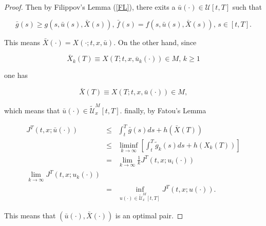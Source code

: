 \begin{proof}
Then by Filippov's Lemma (\ref{FL}), there exits a $\bar{u}(\cdot)\in 
\mathcal{U}[t,T]$ such that

$$\bar{g}(s)\geq 
g(s,\bar{u}(s),\bar{X}(s)),\,\bar{f}(s)=f(s,\bar{u}(s),\bar{X}(s)),\, s\in 
[t,T].$$

This means $\bar{X}(\cdot)=X(\cdot;t,x,\bar{u})$. On the other hand, since

$$\bar{X}_k(T)\equiv X(T;t,x,\bar{u}_k(\cdot))\in M,\, k\geq 1$$

one has 

$$\bar{X}(T)\equiv X(T;t,x,\bar{u}(\cdot))\in M,$$

which means that $\bar{u}(\cdot)\in \tilde{\mathcal{U}}^M_x[t,T]$. finally, by 
Fatou's Lemma

\begin{eqnarray*}
J^T(t,x;\bar{u}(\cdot))&\leq& \int_{t}^{T}\bar{g}(s)ds +h(\bar{X}(T))\\
&\leq& \liminf_{k\rightarrow \infty}[\int_{t}^{T}\tilde{g}_k(s)ds+h(X_k(T))]\\
&=&\lim_{k\rightarrow \infty} \frac{1}{k}J^T(t,x;u_i(\cdot))\\
\lim_{k\rightarrow \infty} J^T(t,x;u_k(\cdot))\\
&=& \inf_{u(\cdot)\in\tilde{\mathcal{U}}^M_x[t,T]}J^T(t,x;u(\cdot)).
\end{eqnarray*}

This means that $(\bar{u}(\cdot),\bar{X}(\cdot))$ is an optimal pair.

\end{proof}








